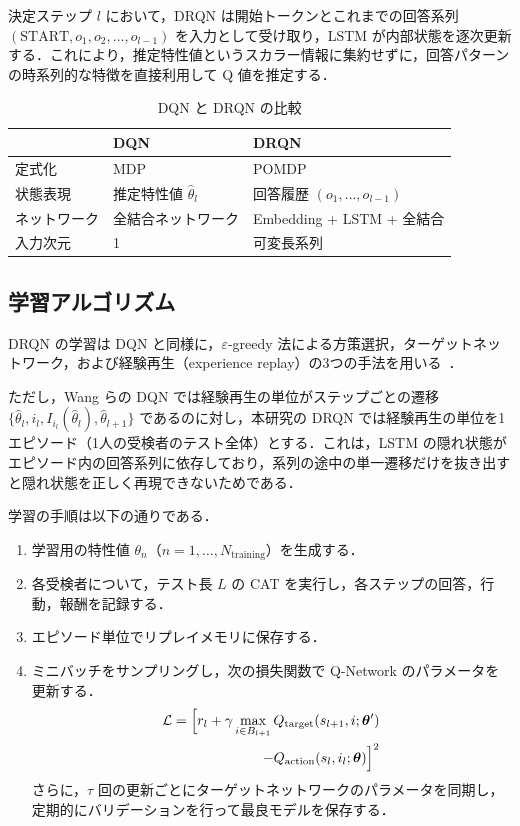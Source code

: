 \documentclass[dvipdfmx,a4j]{jarticle}
\begin{document}
決定ステップ $l$ において，DRQN は開始トークンとこれまでの回答系列 $(\text{START}, o_1, o_2, \ldots, o_{l-1})$ を入力として受け取り，LSTM が内部状態を逐次更新する．これにより，推定特性値というスカラー情報に集約せずに，回答パターンの時系列的な特徴を直接利用して Q 値を推定する．

\begin{table}[t]
\centering
\caption{DQN と DRQN の比較}
\label{tab:dqn_drqn}
\scriptsize
\setlength{\tabcolsep}{3pt}
\begin{tabular}{p{}p{}p{}}
\toprule
 & DQN & DRQN \\
\midrule
定式化 & MDP & POMDP \\
状態表現 & 推定特性値 $\hat{\theta}_l$ & 回答履歴 $(o_1,\ldots,o_{l-1})$ \\
ネットワーク & 全結合ネットワーク & Embedding + LSTM + 全結合 \\
入力次元 & 1 & 可変長系列 \\
\bottomrule
\end{tabular}
\end{table}

\subsection{学習アルゴリズム}

DRQN の学習は DQN と同様に，$\varepsilon$-greedy 法による方策選択，ターゲットネットワーク，および経験再生（experience replay）の3つの手法を用いる~\cite{mnih2013,mnih2015}．

ただし，Wang らの DQN では経験再生の単位がステップごとの遷移 $\{\hat{\theta}_l, i_l, I_{i_l}(\hat{\theta}_l), \hat{\theta}_{l+1}\}$ であるのに対し，本研究の DRQN では経験再生の単位を1エピソード（1人の受検者のテスト全体）とする．これは，LSTM の隠れ状態がエピソード内の回答系列に依存しており，系列の途中の単一遷移だけを抜き出すと隠れ状態を正しく再現できないためである．

学習の手順は以下の通りである．
\begin{enumerate}
\item 学習用の特性値 $\theta_n$（$n = 1,\ldots,N_{\mathrm{training}}$）を生成する．
\item 各受検者について，テスト長 $L$ の CAT を実行し，各ステップの回答，行動，報酬を記録する．
\item エピソード単位でリプレイメモリに保存する．
\item ミニバッチをサンプリングし，次の損失関数で Q-Network のパラメータを更新する．
\begin{align}
\mathcal{L}
= \Bigl[
r_l + \gamma \max_{i \in B_{l+1}} Q_{\mathrm{target}}(s_{l+1}, i; \bm{\theta}') \notag\\
- Q_{\mathrm{action}}(s_l, i_l; \bm{\theta})
\Bigr]^2
\end{align}
さらに，$\tau$ 回の更新ごとにターゲットネットワークのパラメータを同期し，定期的にバリデーションを行って最良モデルを保存する．
\end{enumerate}
\end{document}
